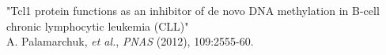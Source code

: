 "Tcl1 protein functions as an inhibitor of de novo DNA methylation in B-cell chronic lymphocytic leukemia (CLL)" \\
\small{A. Palamarchuk, \textit{et al.}, \textit{PNAS} (2012), 109:2555-60.} \\
